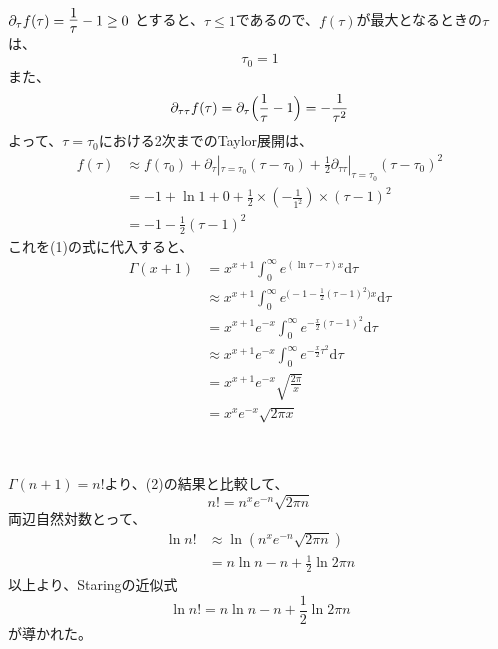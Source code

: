 \documentclass[dvipdfmx,a4paper]{jsarticle}
\begin{document}
\subsection{}
$\partial_{\tau}f(\tau) = \mbox{\Large$\frac{1}{\tau}$} - 1 \geq 0$ とすると、$\tau \leq 1$であるので、$f(\tau)$が最大となるときの$\tau$は、$$\tau_0 = 1$$
また、
$$\partial_{\tau\tau}f(\tau) = \partial_{\tau}\Bigl(\frac{1}{\tau}-1\Bigr) = -\frac{1}{\tau^2}$$
よって、$\tau = \tau_0$における2次までのTaylor展開は、
\begin{align*}
f(\tau) &\approx f(\tau_0) + \partial_{\tau}|_{\tau = \tau_0}(\tau - \tau_0) + \frac{1}{2}\partial_{\tau\tau}|_{\tau = \tau_0}(\tau - \tau_0)^2\\
&= -1 + \ln{1} + 0 + \frac{1}{2} \times (-\frac{1}{1^2})\times(\tau - 1)^2\\
&= -1 - \frac{1}{2}(\tau - 1)^2
\end{align*}
これを(1)の式に代入すると、
\begin{align*}
\Gamma(x + 1) &= x^{x + 1}\int_{0}^{\infty}e^{(\ln{\tau}-\tau)x}\mathrm{d}\tau\\
&\approx x^{x + 1}\int_{0}^{\infty}e^{\bigl(-1 - \frac{1}{2}(\tau - 1)^2\bigr)x}\mathrm{d}\tau\\
&= x^{x + 1}e^{-x}\int_{0}^{\infty}e^{-\frac{x}{2}(\tau - 1)^2}\mathrm{d}\tau\\
&\approx x^{x + 1}e^{-x}\int_{0}^{\infty}e^{-\frac{x}{2}\tau^2}\mathrm{d}\tau\\
&= x^{x + 1}e^{-x}\sqrt{\frac{2\pi}{x}}\\
&= x^xe^{-x}\sqrt{2\pi x}
\end{align*}
\\

\subsection{}
$\Gamma(n+1) = n!$より、(2)の結果と比較して、
$$n! = n^xe^{-n}\sqrt{2\pi n}$$
両辺自然対数とって、
\begin{align*}
\ln{n!} &\approx \ln{(n^xe^{-n}\sqrt{2\pi n})}\\
&= n\ln{n} - n + \frac{1}{2} \ln{2\pi n}
\end{align*}
以上より、Staringの近似式$$\ln{n! = n\ln{n} - n + \frac{1}{2} \ln{2\pi n}}$$が導かれた。\\

\end{document}
